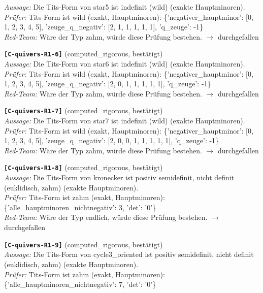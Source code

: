 \documentclass[11pt]{article}
\theoremstyle{definition}\newtheorem{definition}[theorem]{Definition}\newtheorem{remark}[theorem]{Remark}\newtheorem{observation}[theorem]{Numerical observation}
\begin{document}
\textit{Aussage:} Die Tits-Form von star5 ist indefinit (wild) (exakte Hauptminoren).\\
\textit{Prüfer:} Tits-Form ist wild (exakt, Hauptminoren): \{'negativer\_hauptminor': [0, 1, 2, 3, 4, 5], 'zeuge\_q\_negativ': [2, 1, 1, 1, 1, 1], 'q\_zeuge': -1\}\\
\textit{Red-Team:} Wäre der Typ zahm, würde diese Prüfung bestehen. $\to$ durchgefallen\par\medskip
\noindent\textbf{\texttt{[C-quivers-R1-6]}} (computed\_rigorous, bestätigt)\\
\textit{Aussage:} Die Tits-Form von star6 ist indefinit (wild) (exakte Hauptminoren).\\
\textit{Prüfer:} Tits-Form ist wild (exakt, Hauptminoren): \{'negativer\_hauptminor': [0, 1, 2, 3, 4, 5], 'zeuge\_q\_negativ': [2, 0, 1, 1, 1, 1, 1], 'q\_zeuge': -1\}\\
\textit{Red-Team:} Wäre der Typ zahm, würde diese Prüfung bestehen. $\to$ durchgefallen\par\medskip
\noindent\textbf{\texttt{[C-quivers-R1-7]}} (computed\_rigorous, bestätigt)\\
\textit{Aussage:} Die Tits-Form von star7 ist indefinit (wild) (exakte Hauptminoren).\\
\textit{Prüfer:} Tits-Form ist wild (exakt, Hauptminoren): \{'negativer\_hauptminor': [0, 1, 2, 3, 4, 5], 'zeuge\_q\_negativ': [2, 0, 0, 1, 1, 1, 1, 1], 'q\_zeuge': -1\}\\
\textit{Red-Team:} Wäre der Typ zahm, würde diese Prüfung bestehen. $\to$ durchgefallen\par\medskip
\noindent\textbf{\texttt{[C-quivers-R1-8]}} (computed\_rigorous, bestätigt)\\
\textit{Aussage:} Die Tits-Form von kronecker ist positiv semidefinit, nicht definit (euklidisch, zahm) (exakte Hauptminoren).\\
\textit{Prüfer:} Tits-Form ist zahm (exakt, Hauptminoren): \{'alle\_hauptminoren\_nichtnegativ': 3, 'det': '0'\}\\
\textit{Red-Team:} Wäre der Typ endlich, würde diese Prüfung bestehen. $\to$ durchgefallen\par\medskip
\noindent\textbf{\texttt{[C-quivers-R1-9]}} (computed\_rigorous, bestätigt)\\
\textit{Aussage:} Die Tits-Form von cycle3\_oriented ist positiv semidefinit, nicht definit (euklidisch, zahm) (exakte Hauptminoren).\\
\textit{Prüfer:} Tits-Form ist zahm (exakt, Hauptminoren): \{'alle\_hauptminoren\_nichtnegativ': 7, 'det': '0'\}\\
\end{document}
